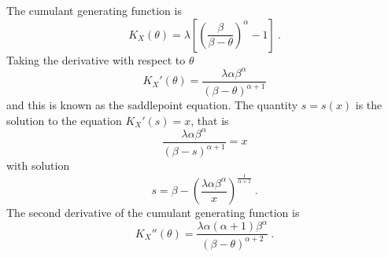 The cumulant generating function is
\begin{equation}
  K_X(\theta) = \lambda
  \left[
    \left(\frac{\beta}{\beta-\theta}\right)^\alpha-1
  \right]
  \ .
  \label{eq:appendix_cgf}
\end{equation}
Taking the derivative with respect to $\theta$
\begin{equation}
  K_X'(\theta)=\frac{\lambda\alpha\beta^\alpha}{(\beta-\theta)^{\alpha+1}}
\end{equation}
and this is known as the saddlepoint equation. The quantity $s=s(x)$ is the solution to the equation $K_X'(s)=x$, that is
\begin{equation*}
  \frac{\lambda\alpha\beta^\alpha}{(\beta-s)^{\alpha+1}} = x
\end{equation*}
with solution
\begin{equation}
  s = \beta - \left(\frac{\lambda\alpha\beta^\alpha}{x}\right)^{\frac{1}{\alpha+1}}
  \ .
  \label{eq:appendix_saddlepointSolution}
\end{equation}
The second derivative of the cumulant generating function is
\begin{equation}
  K_X''(\theta)=\frac{\lambda\alpha(\alpha+1)\beta^\alpha}{(\beta-\theta)^{\alpha+2}} \ .
  \label{eq:appenfix_2nddiffcgf}
\end{equation}

